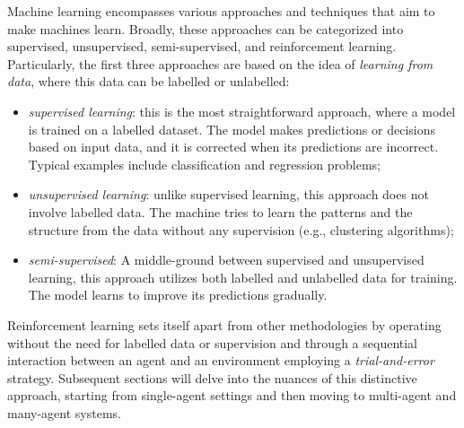 Machine learning encompasses various approaches and techniques that aim to make machines learn. 
 Broadly, these approaches can be categorized into supervised, 
 unsupervised, semi-supervised, and reinforcement learning.
%
Particularly, the first three approaches are based on the idea of \emph{learning from data}, 
 where this data can be labelled or unlabelled:
\begin{itemize}
  \item \emph{supervised learning}: this is the most straightforward approach, where a model is trained on a labelled dataset. 
  The model makes predictions or decisions based on input data, 
  and it is corrected when its predictions are incorrect. 
  Typical examples include classification and regression problems;
  \item \emph{unsupervised learning}: unlike supervised learning, this approach does not involve labelled data. 
  The machine tries to learn the patterns and the structure from the data without any supervision (e.g., clustering algorithms);
  \item \emph{semi-supervised}: A middle-ground between supervised and unsupervised learning, this approach utilizes both labelled and unlabelled data for training. 
  The model learns to improve its predictions gradually.
\end{itemize}
Reinforcement learning sets itself apart from other methodologies 
 by operating without the need for labelled data or supervision and through a sequential interaction between an agent and an environment employing a \emph{trial-and-error} strategy. 
 Subsequent sections will delve into the nuances of this distinctive approach, 
 starting from single-agent settings and then moving to multi-agent and many-agent systems.
